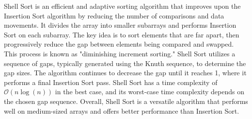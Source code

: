 Shell Sort is an efficient and adaptive sorting algorithm that improves upon the Insertion Sort algorithm by reducing the number of comparisons and data movements. It divides the array into smaller subarrays and performs Insertion Sort on each subarray. The key idea is to sort elements that are far apart, then progressively reduce the gap between elements being
compared and swapped. This process is known as "diminishing increment sorting." Shell Sort utilizes a sequence of gaps, typically generated using the Knuth sequence, to determine the gap sizes. The algorithm continues to decrease the gap until it reaches 1, where it performs a final Insertion Sort pass. Shell Sort has a time complexity of $\mathcal{O}(n\log{(n)})$
in the best case, and its worst-case time complexity depends on the chosen gap sequence. Overall, Shell Sort is a versatile algorithm that performs well on medium-sized arrays and offers better performance than Insertion Sort.

